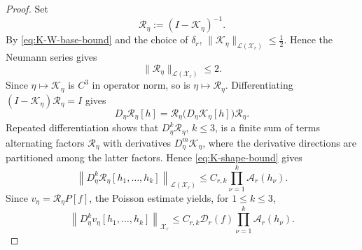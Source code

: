 \documentclass[12pt]{amsart}
\theoremstyle{remark}
\theoremstyle{definition}
\numberwithin{equation}{section}
\begin{document}
\begin{proof}
Set
\[
 \mathcal R_\eta:=(I-\mathcal K_\eta)^{-1}.
\]
By \eqref{eq:K-W-base-bound} and the choice of \(\delta_r\),
\(\|\mathcal K_\eta\|_{\mathcal L(\mathcal X_r)} \leq\frac12\).
Hence the Neumann series gives
\[
 \|\mathcal R_\eta\|_{\mathcal L(\mathcal X_r)}\leq2.
\]
Since \(\eta\mapsto\mathcal K_\eta\) is \(C^3\) in operator norm, so
is \(\eta\mapsto\mathcal R_\eta\). Differentiating
\((I-\mathcal K_\eta)\mathcal R_\eta=I\) gives
\[
 D_\eta\mathcal R_\eta[h]
 = \mathcal R_\eta
 \bigl(D_\eta\mathcal K_\eta[h]\bigr) \mathcal R_\eta.
\]
Repeated differentiation shows that \(D_\eta^k\mathcal R_\eta\), \(k\leq3\), is a finite sum of terms alternating factors \(\mathcal R_\eta\) with derivatives
\(D_\eta^m\mathcal K_\eta\), where the derivative directions are partitioned among the latter factors. 
Hence \eqref{eq:K-shape-bound}
gives
\[
 \left\|D_\eta^k\mathcal R_\eta[h_1,\ldots,h_k]\right\|_{\mathcal L(\mathcal X_r)}
 \leq C_{r,k}\prod_{\nu=1}^k\mathcal A_r(h_\nu).
\]
Since \(v_\eta=\mathcal R_\eta P[f]\), the Poisson estimate yields, for \(1\leq k\leq3\),
\begin{equation*}
 \left\| D_\eta^kv_\eta [h_1,\ldots,h_k] \right\|_{\mathcal X_r} \leq C_{r,k} \mathcal D_r(f) \prod_{\nu=1}^k \mathcal A_r(h_\nu).
\end{equation*}


\end{proof}
\end{document}
